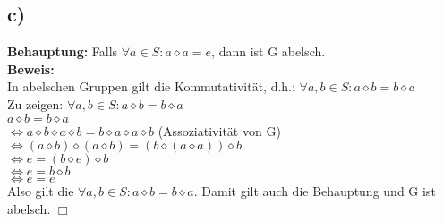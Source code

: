\documentclass[paper = a4, ngerman]{scrartcl}
\begin{document}
	\subsection*{c)}
	\textbf{Behauptung:} Falls $\forall a \in S: a \diamond a = e $, dann ist G abelsch.\\
	
	\textbf{Beweis:}\\
	In abelschen Gruppen gilt die Kommutativität, d.h.: $\forall a, b \in S: a \diamond b = b \diamond a$\\
	
	Zu zeigen: $\forall a, b \in S: a \diamond b = b \diamond a$\\
	
	$a \diamond b = b \diamond a$\\
	$\Leftrightarrow a \diamond b \diamond a \diamond b = b \diamond a\diamond a \diamond b$ \hspace{10mm}(Assoziativität von G)\\
	$\Leftrightarrow (a \diamond b) \diamond (a \diamond b) = (b \diamond (a\diamond a)) \diamond b$  \\
	$\Leftrightarrow e = (b \diamond e) \diamond b$  \\
	$\Leftrightarrow e = b \diamond b$  \\
	$\Leftrightarrow e = e$\\
	
	Also gilt die $\forall a, b \in S: a \diamond b = b \diamond a$. Damit gilt auch die Behauptung und G ist abelsch.
		\hfill$\Box$\\
	
\end{document}
